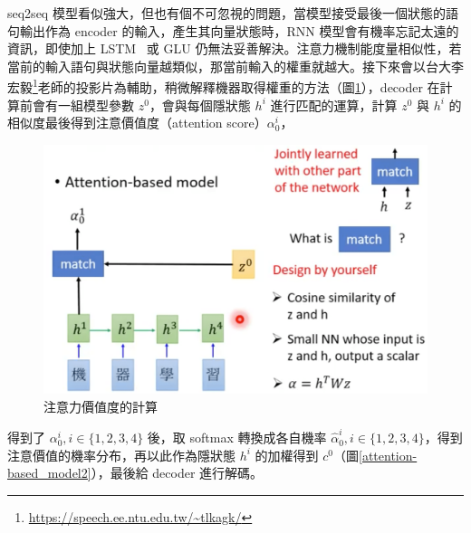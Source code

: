 seq2seq 模型看似強大，但也有個不可忽視的問題，當模型接受最後一個狀態的語句輸出作為 encoder 的輸入，產生其向量狀態時，RNN 模型會有機率忘記太遠的資訊，即使加上 LSTM~\cite{gers1999learning} 或 GLU 仍無法妥善解決。注意力機制能度量相似性，若當前的輸入語句與狀態向量越類似，那當前輸入的權重就越大。接下來會以台大李宏毅\footnote{\url{https://speech.ee.ntu.edu.tw/~tlkagk/}}老師的投影片為輔助，稍微解釋機器取得權重的方法（圖\ref{attention-based_model1}），decoder 在計算前會有一組模型參數 $z^0$，會與每個隱狀態 $h^i$ 進行匹配的運算，計算 $z^0$ 與 $h^i$ 的相似度最後得到注意價值度（attention score）$\alpha_0^i$，
\begin{figure}[htbp]
    \hfil
    \begin{minipage}[t]{0.45\textwidth}
        \includegraphics[width=\textwidth]{./figures/chapter02_method/attention-based_model1.png}
        \caption {注意力價值度的計算}
        \label{attention-based_model1}
    \end{minipage}
    \hfil
\end{figure}
得到了 $\alpha_0^i, i\in\{1,2,3,4\}$ 後，取 softmax 轉換成各自機率 $\hat{\alpha}_0^i, i\in\{1,2,3,4\}$，得到注意價值的機率分布，再以此作為隱狀態 $h^i$ 的加權得到 $c^0$（圖\ref{attention-based_model2}），最後給 decoder 進行解碼。 
